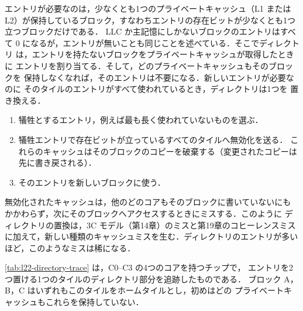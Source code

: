 \documentclass[../main.tex]{subfiles}
\begin{document}
エントリが必要なのは，少なくとも1つのプライベートキャッシュ（L1 または
L2）が保持しているブロック，すなわちエントリの存在ビットが少なくとも1つ
立つブロックだけである．%
LLC か主記憶にしかないブロックのエントリはすべて 0 になるが，エントリが無いことも同じことを述べている．そこでディレクトリ
は，エントリを持たないブロックをプライベートキャッシュが取得したときに
エントリを割り当てる．そして，どのプライベートキャッシュもそのブロックを
保持しなくなれば，そのエントリは不要になる．新しいエントリが必要なのに
そのタイルのエントリがすべて使われているとき，ディレクトリは1つを
置き換える．
\begin{enumerate}
  \item 犠牲とするエントリ，例えば最も長く使われていないものを選ぶ．
  \item 犠牲エントリで存在ビットが立っているすべてのタイルへ無効化を送る．
    これらのキャッシュはそのブロックのコピーを破棄する（変更されたコピーは
    先に書き戻される）．
  \item そのエントリを新しいブロックに使う．
\end{enumerate}
無効化されたキャッシュは，他のどのコアもそのブロックに書いていないにも
かかわらず，次にそのブロックへアクセスするときにミスする．このように
ディレクトリの置換は，3C モデル（第14章）のミスと第19章のコヒーレンスミス
に加えて，新しい種類のキャッシュミスを生む．ディレクトリのエントリが多い
ほど，このようなミスは稀になる．

\begin{example}
  \label{ex:l22-directory-trace}
  \cref{tab:l22-directory-trace} は，C0--C3 の4つのコアを持つチップで，
  エントリを2つ置ける1つのタイルのディレクトリ部分を追跡したものである．
  ブロック A，B，C はいずれもこのタイルをホームタイルとし，初めはどの
  プライベートキャッシュもこれらを保持していない．
\end{example}
\end{document}
